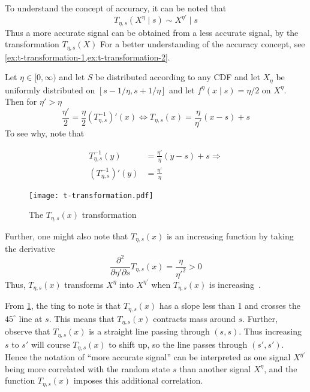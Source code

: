 To understand the concept of accuracy, it can be noted that
\[
	T_{\eta,s}(X^{\eta}\mid s)\sim X^{\eta'}\mid s
\]
Thus a more accurate signal can be obtained from a less accurate signal, by the transformation \(T_{\eta,s}(X)\)  For a better understanding of the accuracy concept, see \cref{ex:t-transformation-1,ex:t-transformation-2}.

\begin{example}\label{ex:t-transformation-1}
Let  \(\eta\in[0,\infty)\) and let \(S\) be distributed according to any CDF and let \(X_{\eta}\) be uniformly distributed on \([s-1/\eta,s+1/\eta]\) and let \(f^\eta(x\mid s)=\eta\big /2\) on \(X^\eta\). Then for \(\eta'>\eta\)
\[
	\frac{\eta'}{2}=\frac{\eta}{2}\left(T_{\eta,s}^{-1}\right)'(x)\Leftrightarrow T_{\eta,s}(x)=\frac{\eta}{\eta'}(x-s)+s
\]
To see why, note that

\begin{align*}
	T^{-1}_{\eta,s}(y)               &=\frac{\eta'}{\eta}(y-s)+s \Rightarrow \\
	\left(T^{-1}_{\eta,s}\right)'(y) &=\frac{\eta'}{\eta}
\end{align*}

\begin{figure}
	\texttt{[image: t-transformation.pdf]}
	\caption{\label{fig:t-transformation}The \(T_{\eta,s}(x)\) transformation}
\end{figure}

Further, one might also note that \(T_{\eta,s}(x)\) is an increasing function by taking the derivative
\[
	\frac{\partial^2}{\partial \eta'\partial s}T_{\eta,s}(x)=\frac{\eta}{\eta'^2}>0
\]
Thus, \(T_{\eta,s}(x)\) transforms \(X^{\eta}\) into \(X^{\eta'}\) when \(T_{\eta,s}(x)\) is increasing~\citep{Persico1996}.

From \cref{fig:t-transformation}, the ting to note is that \(T_{\eta,s}(x)\) has a slope less than 1 and crosses the \(45^\circ\) line at \(s\). This means that \(T_{\eta,s}(x)\) contracts mass around \(s\). Further, observe that \(T_{\eta,s}(x)\) is a straight line passing through \((s,s)\). Thus increasing \(s\) to \(s'\) will course \(T_{\eta,s}(x)\) to shift up, so the line passes through \((s',s')\). Hence the notation of ``more accurate signal'' can be interpreted as one signal \(X^{\eta'}\) being more correlated with the random state \(s\) than another signal \(X^\eta\), and the function \(T_{\eta,s}(x)\) imposes this additional correlation.
\end{example}

